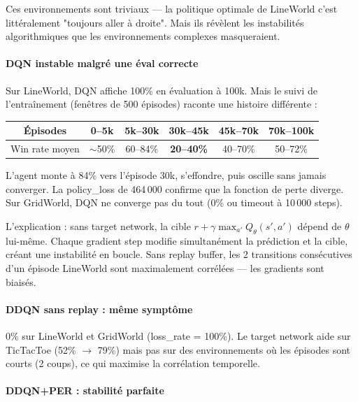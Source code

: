 \documentclass[12pt,a4paper]{article}
\begin{document}
Ces environnements sont triviaux — la politique optimale de LineWorld c'est littéralement "toujours aller à droite". Mais ils révèlent les instabilités algorithmiques que les environnements complexes masqueraient.

\paragraph{DQN instable malgré une éval correcte}

Sur LineWorld, DQN affiche 100\% en évaluation à 100k. Mais le suivi de l'entraînement (fenêtres de 500 épisodes) raconte une histoire différente :

\begin{center}
\begin{tabular}{cccccc}
\toprule
Épisodes & 0--5k & 5k--30k & 30k--45k & 45k--70k & 70k--100k \\
\midrule
Win rate moyen & $\sim$50\% & 60--84\% & \textbf{20--40\%} & 40--70\% & 50--72\% \\
\bottomrule
\end{tabular}
\end{center}

L'agent monte à 84\% vers l'épisode 30k, s'effondre, puis oscille sans jamais converger. La policy\_loss de 464\,000 confirme que la fonction de perte diverge. Sur GridWorld, DQN ne converge pas du tout (0\% ou timeout à 10\,000 steps).

L'explication : sans target network, la cible $r + \gamma \max_{a'} Q_\theta(s', a')$ dépend de $\theta$ lui-même. Chaque gradient step modifie simultanément la prédiction et la cible, créant une instabilité en boucle. Sans replay buffer, les 2 transitions consécutives d'un épisode LineWorld sont maximalement corrélées — les gradients sont biaisés.

\paragraph{DDQN sans replay : même symptôme}

0\% sur LineWorld et GridWorld (loss\_rate = 100\%). Le target network aide sur TicTacToe (52\% $\to$ 79\%) mais pas sur des environnements où les épisodes sont courts (2 coups), ce qui maximise la corrélation temporelle.

\paragraph{DDQN+PER : stabilité parfaite}
\end{document}
